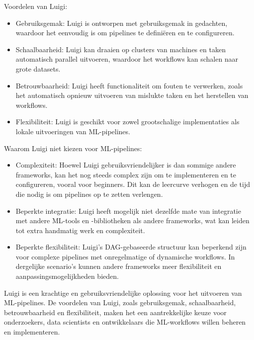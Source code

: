 Voordelen van Luigi:
\begin{itemize}
  \item Gebruiksgemak: Luigi is ontworpen met gebruiksgemak in gedachten, waardoor het eenvoudig is om pipelines te definiëren en te configureren.
  \item Schaalbaarheid: Luigi kan draaien op clusters van machines en taken automatisch parallel uitvoeren, waardoor het workflows kan schalen naar grote datasets.
  \item Betrouwbaarheid: Luigi heeft functionaliteit om fouten te verwerken, zoals het automatisch opnieuw uitvoeren van mislukte taken en het herstellen van workflows.
  \item Flexibiliteit: Luigi is geschikt voor zowel grootschalige implementaties als lokale uitvoeringen van ML-pipelines.
\end{itemize}

Waarom Luigi niet kiezen voor ML-pipelines:
\begin{itemize}
    \item Complexiteit: Hoewel Luigi gebruiksvriendelijker is dan sommige andere frameworks, kan het nog steeds complex zijn om te implementeren en te configureren, vooral voor beginners. Dit kan de leercurve verhogen en de tijd die nodig is om pipelines op te zetten verlengen.
    \item Beperkte integratie: Luigi heeft mogelijk niet dezelfde mate van integratie met andere ML-tools en -bibliotheken als andere frameworks, wat kan leiden tot extra handmatig werk en complexiteit.
    \item Beperkte flexibiliteit: Luigi's DAG-gebaseerde structuur kan beperkend zijn voor complexe pipelines met onregelmatige of dynamische workflows. In dergelijke scenario's kunnen andere frameworks meer flexibiliteit en aanpassingsmogelijkheden bieden.
  \end{itemize}

Luigi is een krachtige en gebruiksvriendelijke oplossing voor het uitvoeren van ML-pipelines. De voordelen van Luigi, zoals gebruiksgemak, schaalbaarheid, betrouwbaarheid en flexibiliteit, maken het een aantrekkelijke keuze voor onderzoekers, data scientists en ontwikkelaars die ML-workflows willen beheren en implementeren.
\begin{verbatim}
\end{verbatim}



